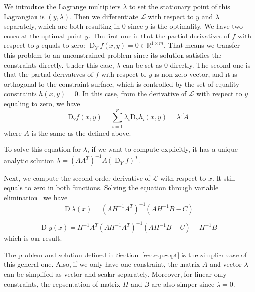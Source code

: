 \par We introduce the Lagrange multipliers $\lambda$ to set the stationary point of this Lagrangian is $(y, \lambda)$. Then we differentiate $\mathcal{L}$ with respect to $y$ and $\lambda$ separately, which are both resulting in 0 since $y$ is the optimality. We have two cases at the optimal point $y$. The first one is that the partial derivatives of $f$ with respect to $y$ equals to zero: $\operatorname{D}_Yf(x,y) = 0 \in \mathbb{R}^{1 \times m}$. That means we transfer this problem to an unconstrained problem since its solution satisfies the constraints directly. Under this case, $\lambda$ can be set as 0 directly. The second one is that the partial derivatives of $f$ with respect to $y$ is non-zero vector, and it is orthogonal to the constraint surface, which is controlled by the set of equality constraints $h(x, y) = 0$. In this case, from the derivative of $\mathcal{L}$ with respect to $y$ equaling to zero, we have
\begin{equation}
    \mathrm{D}_{Y} f(x, y)=\sum_{i=1}^{p} \lambda_{i} \mathrm{D}_{Y} h_{i}(x, y)=\lambda^{T} A
\end{equation}
where $A$ is the same as the defined above. 
\par To solve this equation for $\lambda$, if we want to compute explicitly, it has a unique analytic solution $\lambda = (AA^T)^{-1}A(\operatorname{D}_Yf)^T$. 

\par Next, we compute the second-order derivative of $\mathcal{L}$ with respect to $x$. It still equals to zero in both functions. Solving the equation through variable elimination~\citep{BS:04} we have
\begin{equation}
    \operatorname{D} \lambda(x)=\left(A H^{-1} A^{T}\right)^{-1}\left(A H^{-1} B-C\right)
\end{equation}

\begin{equation}
    \operatorname{D} y(x)=H^{-1} A^{T}\left(A H^{-1} A^{T}\right)^{-1}\left(A H^{-1} B-C\right)-H^{-1} B
\end{equation}
which is our result. 
\par The problem and solution defined in Section~\ref{sec:equ-opt} is the simplier case of this general one. Also, if we only have one constraint, the matrix $A$ and vector $\lambda$ can be simplifed as vector and scalar separately. Moreover, for linear only constraints, the repsentation of matrix $H$ and $B$ are also simper since $\lambda = 0$.  

